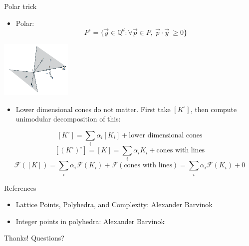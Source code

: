 \documentclass[8pt]{beamer}
\begin{document}
\begin{frame}[label=sec-16]{Polar trick}
\begin{itemize}
\item Polar: $$P^\circ = \Bigg\{ \vec y \in \mathbb{Q}^d :  \forall \vec p \in P, \  \vec p \cdot \vec y  \ \geq 0 \Bigg\}$$
\end{itemize}

\begin{center}
\includegraphics[width=3.40cm, keepaspectratio]{res/polar-of-cone.png}
\end{center}

\begin{itemize}
\item Lower dimensional cones do not matter. First take $[K^\circ]$, then compute unimodular decomposition of this:
\end{itemize}
$$[K^\circ] = \sum_i \alpha_i [K_i] + \text{lower dimensional cones}$$
$$[(K^\circ)^\circ] = [K] = \sum_i \alpha_i K_i + \text{cones with lines}$$
$$ \mathcal{F}([K]) = \sum_i \alpha_i \mathcal{F}(K_i) + \mathcal{F}(\text{cones with lines}) = \sum_i \alpha_i \mathcal{F}(K_i) + 0$$
\end{frame}



\begin{frame}[label=sec-17]{References}
\begin{itemize}
\item Lattice Points, Polyhedra, and Complexity: Alexander Barvinok
\item Integer points in polyhedra: Alexander Barvinok
\end{itemize}
\end{frame}


\begin{frame}[label=sec-18]{Thanks!}
Questions?
\end{frame}
\end{document}
